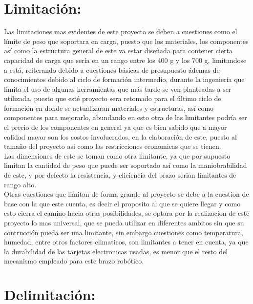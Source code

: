 \documentclass[14pt,a4paper]{article}
\begin{document}
\section{Limitación:}
Las limitaciones mas evidentes de este proyecto se deben a cuestiones como el límite de peso que soportara en carga, puesto que los materiales, los componentes así como la estructura general de este va estar diseñada para contener cierta capacidad de carga que sería en un rango entre los 400 g y los 700 g, limitandose a está, reiterando debido a cuestiones básicas de presupuesto ádemas de conocimientos debido al ciclo de formación intermedio, durante la ingeniería que limita el uso de algunas herramientas que más tarde se ven planteadas a ser utilizada, puesto que esté proyecto sera retomado para el último ciclo de formación en donde se actualizaran materiales y estructuras, así como componentes para mejorarlo, abundando en esto otra de las limitantes podría ser el precio de los componentes en general ya que es bien sabido que a mayor calidad mayor son los costos involucrados, en la elaboración de este, puesto al tamaño del proyecto asi como las restricciones economicas que se tienen.\\
Las dimensiones de este se toman como otra limitante, ya que por supuesto limitan la cantidad de peso que puede ser soportado así como la maniobrabilidad de este, y por defecto la resistencia, y eficiencia del brazo serian limitantes de rango alto.\\
Otras cuestiones que limitan de forma grande al proyecto se debe a la cuestion de base con la que este cuenta, es decir el proposito al que se quiere llegar y como esto cierra el camino hacia otras posibilidades, se optara por la realizacion de esté proyecto lo mas universal, que se pueda utilizar en diferentes ambitos sin que su contrucción pueda ser una limitante, sin embargo cuestiones como temperatura, humedad, entre otros factores climaticos, son limitantes a tener en cuenta, ya que la durabilidad de las tarjetas electronicas usadas, es menor que el resto del mecanismo empleado para este brazo robótico.

\section{Delimitación:}
\end{document}
